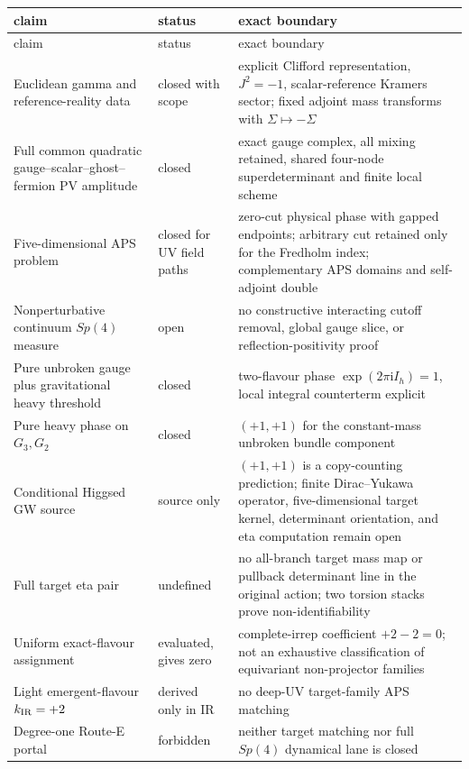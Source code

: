 \documentclass[11pt]{article}
\theoremstyle{definition}
\theoremstyle{remark}
\newcommand{\ii}{\mathrm i}
\newcommand{\status}[1]{\textcolor{blue!60!black}{\textsf{#1}}}
\begin{document}
\begin{longtable}{@{}L{0.36\textwidth}L{0.16\textwidth}L{0.39\textwidth}@{}}
\toprule
claim & status & exact boundary\\
\midrule
\endfirsthead
\toprule
claim & status & exact boundary\\
\midrule
\endhead
Euclidean gamma and reference-reality data & \status{closed with scope} &
explicit Clifford representation, \(J^2=-1\), scalar-reference Kramers
sector; fixed adjoint mass transforms with \(\Sigma\mapsto-\Sigma\)\\
Full common quadratic gauge--scalar--ghost--fermion PV amplitude &
\status{closed} & exact gauge complex, all mixing retained, shared four-node
superdeterminant and finite local scheme\\
Five-dimensional APS problem & \status{closed for UV field paths} & zero-cut
physical phase with gapped endpoints; arbitrary cut retained only for the
Fredholm index; complementary APS domains and self-adjoint double\\
Nonperturbative continuum \(Sp(4)\) measure & \status{open} & no constructive
interacting cutoff removal, global gauge slice, or reflection-positivity proof\\
Pure unbroken gauge plus gravitational heavy threshold & \status{closed} &
two-flavour phase \(\exp(2\pi\ii I_h)=1\), local integral counterterm explicit\\
Pure heavy phase on \(G_3,G_2\) & \status{closed} & \((+1,+1)\) for the
constant-mass unbroken bundle component\\
Conditional Higgsed GW source & \status{source only} & \((+1,+1)\) is a
copy-counting prediction; finite Dirac--Yukawa operator, five-dimensional
target kernel, determinant orientation, and eta computation remain open\\
Full target eta pair & \status{undefined} & no all-branch target mass map or
pullback determinant line in the original action; two torsion stacks prove
non-identifiability\\
Uniform exact-flavour assignment & \status{evaluated, gives zero} &
complete-irrep coefficient \(+2-2=0\); not an exhaustive classification of
equivariant non-projector families\\
Light emergent-flavour \(k_{\rm IR}=+2\) & \status{derived only in IR} & no
deep-UV target-family APS matching\\
Degree-one Route-E portal & \status{forbidden} & neither target matching nor
full \(Sp(4)\) dynamical lane is closed\\
\bottomrule
\end{longtable}
\end{document}
